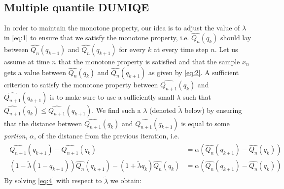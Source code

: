 \documentclass[10pt, a4paper]{article}
\newtheorem{rational for conjecture}{Rational for Conjecture}
\begin{document}
\subsection{Multiple quantile DUMIQE}
\label{sec:md}

In order to maintain the monotone property, our idea is to adjust the value of $\lambda$ in \eqref{eq:1} to ensure that we satisfy the monotone property, i.e. $\widehat{Q_{n}}(q_k)$ should lay between $\widehat{Q_{n}}(q_{k-1})$ and $\widehat{Q_{n}}(q_{k+1})$ for every $k$ at every time step $n$. Let us assume at time $n$ that the monotone property is satisfied and that the sample $x_n$ gets a value between $\widehat{Q_{n}}(q_k)$ and $\widehat{Q_{n}}(q_{k+1})$ as given by \eqref{eq:2}.
A sufficient criterion to satisfy the monotone property between $\widehat{Q_{n+1}}(q_k)$ and $\widehat{Q_{n+1}}(q_{k+1})$ is to make sure to use a sufficiently small $\lambda$ such that $\widehat{Q_{n+1}}(q_k) \leq \widehat{Q_{n+1}}(q_{k+1})$. We find such a $\lambda$ (denoted $\widetilde{\lambda}$ below) by ensuring that the distance between $\widehat{Q_{n+1}}(q_k)$ and $\widehat{Q_{n+1}}(q_{k+1})$ is equal to some \emph{portion}, $\alpha$, of the distance from the previous iteration, i.e.
\begin{align}
  \label{eq:4}
  \begin{split}
  \widehat{Q_{n+1}}(q_{k+1}) - \widehat{Q_{n+1}}(q_k) &= \alpha \left(\widehat{Q_{n}}(q_{k+1}) - \widehat{Q_{n}}(q_k) \right) \\
  (1 - \widetilde{\lambda} (1-q_{k+1})) \widehat{Q_{n}}(q_{k+1}) - (1 + \widetilde{\lambda} q_k) \widehat{Q_{n}}(q_k) &= \alpha \left(\widehat{Q_{n}}(q_{k+1}) - \widehat{Q_{n}}(q_k) \right)
  \end{split}
\end{align}
By solving \eqref{eq:4} with respect to $\widetilde{\lambda}$ we obtain:
\end{document}
